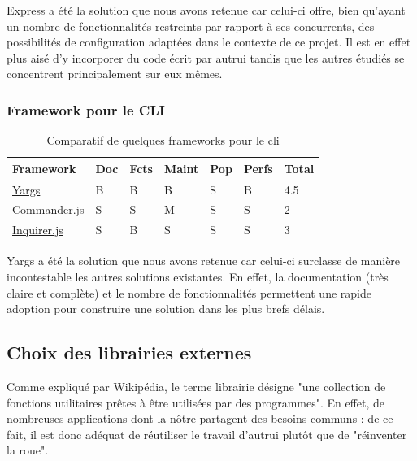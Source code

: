 Express a été la solution que nous avons retenue car celui-ci offre, bien qu'ayant un nombre de fonctionnalités restreints par rapport à ses concurrents, des possibilités de configuration  adaptées dans le contexte de ce projet. Il est en effet plus aisé d'y incorporer du code écrit par autrui tandis que les autres étudiés se concentrent principalement sur eux mêmes. 

\subsubsection*{Framework pour le CLI}

\begin{table}[H]
    \centering
    \begin{tabular}{| l | l | l | l | l | l | l |}
    \hline
        Framework & Doc & Fcts & Maint & Pop & Perfs & Total \\
    \hline
        \href{http://yargs.js.org/}{Yargs} &
        B &  
        B &
        B &            
        S &              
        B &   
        4.5 \\
    \hline
        \href{https://github.com/tj/commander.js}{Commander.js} &
        S &                
        S &   
        M &
        S &              
        S &  
        2 \\
    \hline
        \href{https://github.com/SBoudrias/Inquirer.js}{Inquirer.js} &
        S &                
        B &     
        S &
        S &              
        S &      
        3 \\  
    \hline
    \end{tabular}
    \caption{Comparatif de quelques frameworks pour le \Gls{cli}}
    \label{table:compFrameworksCLI}
\end{table}

Yargs a été la solution que nous avons retenue car celui-ci surclasse de manière incontestable les autres solutions existantes. En effet, la documentation (très claire et complète) et le nombre de fonctionnalités permettent une rapide adoption pour construire une solution dans les plus brefs délais. 

\subsection*{Choix des librairies externes}

Comme expliqué par Wikipédia\cite{libraryDef}, le terme librairie désigne "une collection de fonctions utilitaires prêtes à être utilisées par des programmes". En effet, de nombreuses applications dont la nôtre partagent des besoins communs : de ce fait, il est donc adéquat de réutiliser le travail d'autrui plutôt que de "réinventer la roue". \\

